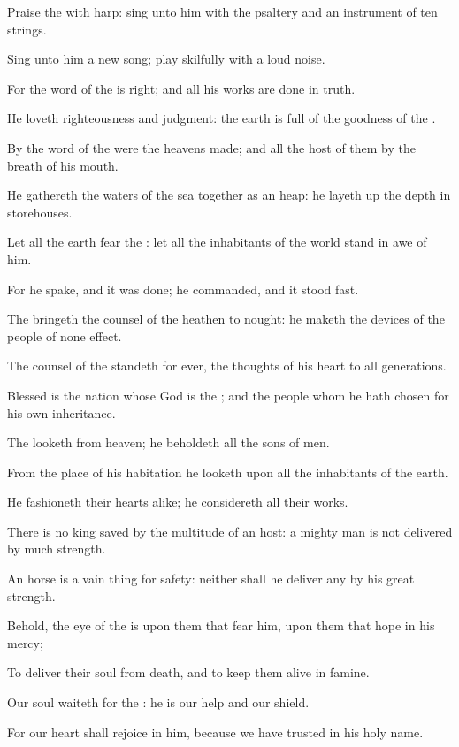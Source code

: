 \Verse Praise the \LORD with harp: sing unto him with the psaltery and an instrument of ten strings.

\Verse Sing unto him a new song; play skilfully with a loud noise.

\Verse For the word of the \LORD is right; and all his works are done in truth.

\Verse He loveth righteousness and judgment: the earth is full of the goodness of the \LORD.

\Verse By the word of the \LORD were the heavens made; and all the host of them by the breath of his mouth.

\Verse He gathereth the waters of the sea together as an heap: he layeth up the depth in storehouses.

\Verse Let all the earth fear the \LORD: let all the inhabitants of the world stand in awe of him.

\Verse For he spake, and it was done; he commanded, and it stood fast.

\Verse The \LORD bringeth the counsel of the heathen to nought: he maketh the devices of the people of none effect.

\Verse The counsel of the \LORD standeth for ever, the thoughts of his heart to all generations.

\Verse Blessed is the nation whose God is the \LORD; and the people whom he hath chosen for his own inheritance.

\Verse The \LORD looketh from heaven; he beholdeth all the sons of men.

\Verse From the place of his habitation he looketh upon all the inhabitants of the earth.

\Verse He fashioneth their hearts alike; he considereth all their works.

\Verse There is no king saved by the multitude of an host: a mighty man is not delivered by much strength.

\Verse An horse is a vain thing for safety: neither shall he deliver any by his great strength.

\Verse Behold, the eye of the \LORD is upon them that fear him, upon them that hope in his mercy;

\Verse To deliver their soul from death, and to keep them alive in famine.

\Verse Our soul waiteth for the \LORD: he is our help and our shield.

\Verse For our heart shall rejoice in him, because we have trusted in his holy name.

